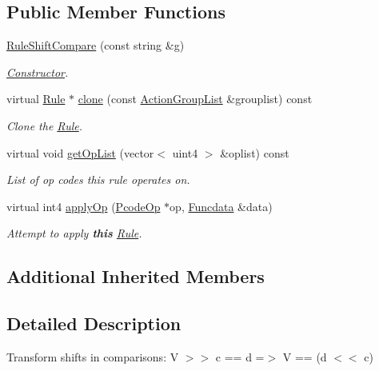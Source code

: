 \subsection*{Public Member Functions}
\begin{DoxyCompactItemize}
\item 
\mbox{\hyperlink{class_rule_shift_compare_ac354a9d13a848a27d0bbe78014fe6a7f}{Rule\+Shift\+Compare}} (const string \&g)
\begin{DoxyCompactList}\small\item\em \mbox{\hyperlink{class_constructor}{Constructor}}. \end{DoxyCompactList}\item 
virtual \mbox{\hyperlink{class_rule}{Rule}} $\ast$ \mbox{\hyperlink{class_rule_shift_compare_aea9f8ff6217f01e880ae5c3fd4370837}{clone}} (const \mbox{\hyperlink{class_action_group_list}{Action\+Group\+List}} \&grouplist) const
\begin{DoxyCompactList}\small\item\em Clone the \mbox{\hyperlink{class_rule}{Rule}}. \end{DoxyCompactList}\item 
virtual void \mbox{\hyperlink{class_rule_shift_compare_af7f79c1e9cc85d39b7dd16a29b3e8a95}{get\+Op\+List}} (vector$<$ uint4 $>$ \&oplist) const
\begin{DoxyCompactList}\small\item\em List of op codes this rule operates on. \end{DoxyCompactList}\item 
virtual int4 \mbox{\hyperlink{class_rule_shift_compare_a8104a2a2506b0a63aeba91f4a9d505ba}{apply\+Op}} (\mbox{\hyperlink{class_pcode_op}{Pcode\+Op}} $\ast$op, \mbox{\hyperlink{class_funcdata}{Funcdata}} \&data)
\begin{DoxyCompactList}\small\item\em Attempt to apply {\bfseries{this}} \mbox{\hyperlink{class_rule}{Rule}}. \end{DoxyCompactList}\end{DoxyCompactItemize}
\subsection*{Additional Inherited Members}


\subsection{Detailed Description}
Transform shifts in comparisons\+: {\ttfamily V $>$$>$ c == d =$>$ V == (d $<$$<$ c)} 

